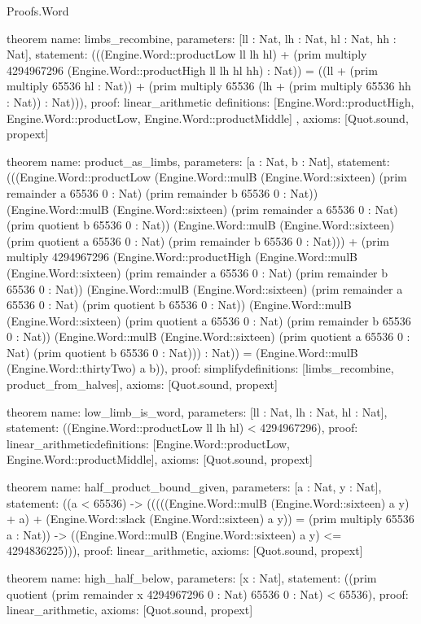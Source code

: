 \begin{lexlean}{Proofs.Word}
\begin{semanticmodule}
theorem{
  name: limbs_recombine,
  parameters: [ll : Nat, lh : Nat, hl : Nat, hh : Nat],
  statement: (((Engine.Word::productLow ll lh hl) + (prim multiply 4294967296 (Engine.Word::productHigh ll lh hl hh) : Nat)) = ((ll + (prim multiply 65536 hl : Nat)) + (prim multiply 65536 (lh + (prim multiply 65536 hh : Nat)) : Nat))),
  proof: linear_arithmetic{
    definitions: [Engine.Word::productHigh, Engine.Word::productLow, Engine.Word::productMiddle]
  },
  axioms: [Quot.sound, propext]
}

theorem{
  name: product_as_limbs,
  parameters: [a : Nat, b : Nat],
  statement: (((Engine.Word::productLow (Engine.Word::mulB (Engine.Word::sixteen) (prim remainder a 65536 0 : Nat) (prim remainder b 65536 0 : Nat)) (Engine.Word::mulB (Engine.Word::sixteen) (prim remainder a 65536 0 : Nat) (prim quotient b 65536 0 : Nat)) (Engine.Word::mulB (Engine.Word::sixteen) (prim quotient a 65536 0 : Nat) (prim remainder b 65536 0 : Nat))) + (prim multiply 4294967296 (Engine.Word::productHigh (Engine.Word::mulB (Engine.Word::sixteen) (prim remainder a 65536 0 : Nat) (prim remainder b 65536 0 : Nat)) (Engine.Word::mulB (Engine.Word::sixteen) (prim remainder a 65536 0 : Nat) (prim quotient b 65536 0 : Nat)) (Engine.Word::mulB (Engine.Word::sixteen) (prim quotient a 65536 0 : Nat) (prim remainder b 65536 0 : Nat)) (Engine.Word::mulB (Engine.Word::sixteen) (prim quotient a 65536 0 : Nat) (prim quotient b 65536 0 : Nat))) : Nat)) = (Engine.Word::mulB (Engine.Word::thirtyTwo) a b)),
  proof: simplify{definitions: [limbs_recombine, product_from_halves]},
  axioms: [Quot.sound, propext]
}

theorem{
  name: low_limb_is_word,
  parameters: [ll : Nat, lh : Nat, hl : Nat],
  statement: ((Engine.Word::productLow ll lh hl) < 4294967296),
  proof: linear_arithmetic{definitions: [Engine.Word::productLow, Engine.Word::productMiddle]},
  axioms: [Quot.sound, propext]
}

theorem{
  name: half_product_bound_given,
  parameters: [a : Nat, y : Nat],
  statement: ((a < 65536) -> (((((Engine.Word::mulB (Engine.Word::sixteen) a y) + a) + (Engine.Word::slack (Engine.Word::sixteen) a y)) = (prim multiply 65536 a : Nat)) -> ((Engine.Word::mulB (Engine.Word::sixteen) a y) <= 4294836225))),
  proof: linear_arithmetic{},
  axioms: [Quot.sound, propext]
}

theorem{
  name: high_half_below,
  parameters: [x : Nat],
  statement: ((prim quotient (prim remainder x 4294967296 0 : Nat) 65536 0 : Nat) < 65536),
  proof: linear_arithmetic{},
  axioms: [Quot.sound, propext]
}


\end{semanticmodule}
\end{lexlean}
